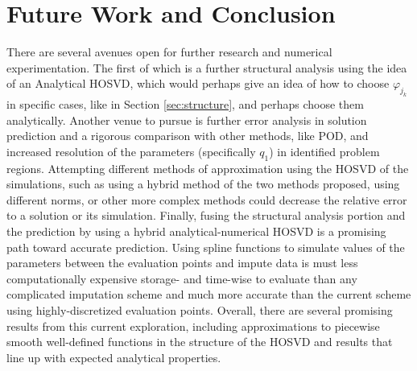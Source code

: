 \documentclass[12pt]{article}
\begin{document}
    \section{Future Work and Conclusion}
    There are several avenues open for further research and numerical experimentation. The first of which is a further structural analysis using the idea of an Analytical HOSVD, which would perhaps give an idea of how to choose $\varphi_{j_k}$ in specific cases, like in Section \ref{sec:structure}, and perhaps choose them analytically. Another venue to pursue is further error analysis in solution prediction and a rigorous comparison with other methods, like POD, and increased resolution of the parameters (specifically $q_1$) in identified problem regions. Attempting different methods of approximation using the HOSVD of the simulations, such as using a hybrid method of the two methods proposed, using different norms, or other more complex methods could decrease the relative error to a solution or its simulation. Finally, fusing the structural analysis portion and the prediction by using a hybrid analytical-numerical HOSVD is a promising path toward accurate prediction. Using spline functions to simulate values of the parameters between the evaluation points and impute data is must less computationally expensive storage- and time-wise to evaluate than any complicated imputation scheme and much more accurate than the current scheme using highly-discretized evaluation points. Overall, there are several promising results from this current exploration, including approximations to piecewise smooth well-defined functions in the structure of the HOSVD and results that line up with expected analytical properties.

    \newpage
     
    
\end{document}

